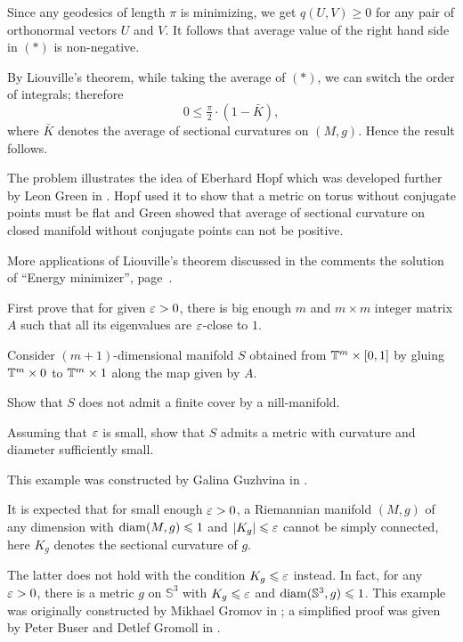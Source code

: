 Since any geodesics of length $\pi$ is minimizing,
we get $q(U,V)\ge0$ for any pair of orthonormal vectors $U$ and $V$.
It follows that average value of the right hand side in $({*})$ is non-negative.

By Liouville's theorem, while taking the average of $({*})$, we can switch the order of integrals;
therefore  
\[0\le \tfrac\pi2\cdot(1-\bar{K}),\]
where $\bar{K}$ denotes the average of sectional curvatures on $(M,g)$.
Hence the result follows.\qeds

The problem illustrates the idea of Eberhard Hopf \cite[see][]{hopf-conjugate}
which was developed further by Leon Green in \cite{green}.
Hopf used it to show that a metric on torus without conjugate points must be flat
and Green showed that average of sectional curvature on closed manifold without conjugate points can not be positive.

More applications of Liouville's theorem discussed in the comments the solution of ``Energy minimizer'', page~\pageref{page:liouville}.






First prove that for given $\varepsilon>0$, 
there is big enough $m$ and $m\times m$ integer matrix 
$A$ such that all its eigenvalues are $\varepsilon$-close to $1$. 

Consider $(m+1)$-dimensional manifold $S$ obtained from $\mathbb{T}^m\times [0,1]$ by gluing $\mathbb{T}^m\times 0$ to $\mathbb{T}^m\times 1$ along the map given by $A$.

Show that $S$ does not admit a finite cover by a nill-manifold.

Assuming that $\varepsilon$ is small,
show that $S$ admits a metric with curvature and diameter sufficiently small.\qeds

\label{page-sol:almost-flat}
This example was constructed 
by Galina Guzhvina in \cite{guzhvina}.

It is expected that for small enough $\varepsilon>0$,
a Riemannian manifold $(M,g)$ of any dimension 
with  $\operatorname{\rm diam}(M,g)\leqslant 1$ and $|K_g|\leqslant \varepsilon$ cannot be simply connected,
here $K_g$ denotes the sectional curvature of $g$.

The latter does not hold with the condition $K_g\leqslant \varepsilon$ instead.
In fact, 
for any $\varepsilon>0$,
there is a metric $g$ on $\mathbb{S}^3$ 
with $K_g\leqslant \varepsilon$ and $\operatorname{\rm diam}(\mathbb{S}^3,g)\leqslant 1$.
This example was originally constructed by Mikhael Gromov in \cite{gromov-almost-flat}; 
a simplified proof was given by 
Peter Buser
and Detlef Gromoll in \cite{buser-gromoll}.


